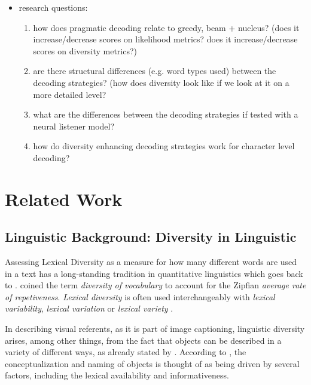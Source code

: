\documentclass[11pt,a4paper]{article}
\begin{document}
\begin{itemize}

	\item research questions: 
	\begin{enumerate}
		\item how does pragmatic decoding relate to greedy, beam + nucleus? (does it increase/decrease scores on likelihood metrics? does it increase/decrease scores on diversity metrics?)
		\item are there structural differences (e.g. word types used) between the decoding strategies? (how does diversity look like if we look at it on a more detailed level?
		\item what are the differences between the decoding strategies if tested with a neural listener model?
		\item how do diversity enhancing decoding strategies work for character level decoding?
	\end{enumerate}

\end{itemize}

\section{Related Work}

\subsection{Linguistic Background: Diversity in Linguistic }

Assessing Lexical Diversity as a measure for how many different words are used in a text \citep{Johansson2008} has a long-standing tradition in quantitative linguistics which goes back to \citet{Zipf1935, Zipf1937}. \citet{Carroll1938} coined the term \textit{diversity of vocabulary} to account for the Zipfian \textit{average rate of repetiveness}. 
\textit{Lexical diversity} is often used interchangeably with \textit{lexical variability}, \textit{lexical variation} or \textit{lexical variety} \citep[cf.][]{Jarvis2013}.

In describing visual referents, as it is part of image captioning, linguistic diversity arises, among other things, from the fact that objects can be described in a variety of different ways, as already stated by \citet{Brown1958}. 
According to \citet{Brennan1996}, the conceptualization and naming of objects is thought of as being driven by several factors, including the lexical availability and informativeness.
\end{document}
